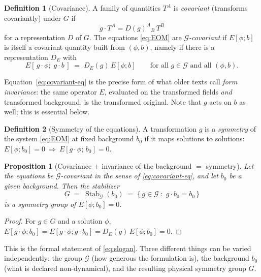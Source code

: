 \documentclass[11pt,a4paper,openany]{book}
\theoremstyle{definition}
\newtheorem{definition}{Definition}[chapter]
\theoremstyle{plain}
\newtheorem{proposition}{Proposition}[chapter]
\theoremstyle{remark}
\DeclareMathOperator{\Stab}{Stab}
\begin{document}
\begin{definition}[Covariance]\label{def:covariance}
A family of quantities $T^A$ is \emph{covariant} (transforms covariantly)
under $G$ if
\begin{equation}\label{eq:covariant-object}
  g\cdot T^A = D(g)^A{}_B\,T^B
\end{equation}
for a representation $D$ of $G$. The equations \eqref{eq:EOM} are
\emph{$\mathcal G$-covariant} if $E[\phi;b]$ is itself a covariant quantity
built from $(\phi,b)$, namely if there is a representation $D_E$ with
\begin{equation}\label{eq:covariant-eq}
  E[\,g\cdot\phi;\;g\cdot b\,] \;=\; D_E(g)\,E[\phi;b]
  \qquad\text{for all } g\in\mathcal G \text{ and all } (\phi,b).
\end{equation}
\end{definition}

Equation~\eqref{eq:covariant-eq} is the precise form of what older texts call
\emph{form invariance}: the same operator $E$, evaluated on the transformed
fields \emph{and} transformed background, is the transformed original. Note that
$g$ acts on $b$ as well; this is essential below.

\begin{definition}[Symmetry of the equations]\label{def:symmetry}
A transformation $g$ is a \emph{symmetry} of the system \eqref{eq:EOM} at
fixed background $b_0$ if it maps solutions to solutions:
$E[\phi;b_0]=0\ \Rightarrow\ E[g\cdot\phi;\,b_0]=0$.
\end{definition}

\begin{proposition}[Covariance $+$ invariance of the background $=$ symmetry]
\label{prop:main}
Let the equations be $\mathcal G$-covariant in the sense of
\eqref{eq:covariant-eq}, and let $b_0$ be a given background. Then the
stabilizer
\begin{equation}\label{eq:stabilizer}
  G \;=\; \Stab_{\mathcal G}(b_0)\;=\;\{\,g\in\mathcal G\;:\; g\cdot b_0=b_0\,\}
\end{equation}
is a symmetry group of $E[\phi;b_0]=0$.
\end{proposition}
\begin{proof}
For $g\in G$ and a solution $\phi$,
$E[g\cdot\phi;b_0]=E[g\cdot\phi;g\cdot b_0]=D_E(g)\,E[\phi;b_0]=0.$
\end{proof}

This is the formal statement of \eqref{eq:slogan}. Three different things
can be varied independently: the group $\mathcal G$ (how generous the
formulation is), the background $b_0$ (what is declared non-dynamical), and
the resulting physical symmetry group $G$.
\end{document}
